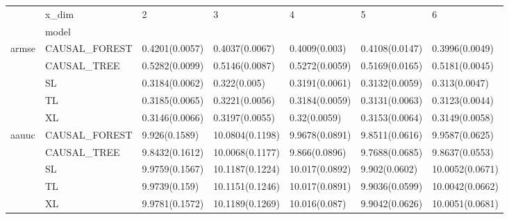 \begin{tabular}{lllllll}
\toprule
      & x\_dim &               2 &                3 &               4 &               5 &                6 \\
{} & model &                 &                  &                 &                 &                  \\
\midrule
armse & CAUSAL\_FOREST &  0.4201(0.0057) &   0.4037(0.0067) &   0.4009(0.003) &  0.4108(0.0147) &   0.3996(0.0049) \\
      & CAUSAL\_TREE &  0.5282(0.0099) &   0.5146(0.0087) &  0.5272(0.0059) &  0.5169(0.0165) &   0.5181(0.0045) \\
      & SL &  0.3184(0.0062) &     0.322(0.005) &  0.3191(0.0061) &  0.3132(0.0059) &    0.313(0.0047) \\
      & TL &  0.3185(0.0065) &   0.3221(0.0056) &  0.3184(0.0059) &  0.3131(0.0063) &   0.3123(0.0044) \\
      & XL &  0.3146(0.0066) &   0.3197(0.0055) &    0.32(0.0059) &  0.3153(0.0064) &   0.3149(0.0058) \\
aauuc & CAUSAL\_FOREST &   9.926(0.1589) &  10.0804(0.1198) &  9.9678(0.0891) &  9.8511(0.0616) &   9.9587(0.0625) \\
      & CAUSAL\_TREE &  9.8432(0.1612) &  10.0068(0.1177) &   9.866(0.0896) &  9.7688(0.0685) &   9.8637(0.0553) \\
      & SL &  9.9759(0.1567) &  10.1187(0.1224) &  10.017(0.0892) &   9.902(0.0602) &  10.0052(0.0671) \\
      & TL &   9.9739(0.159) &  10.1151(0.1246) &  10.017(0.0891) &  9.9036(0.0599) &  10.0042(0.0662) \\
      & XL &  9.9781(0.1572) &  10.1189(0.1269) &   10.016(0.087) &  9.9042(0.0626) &  10.0051(0.0681) \\
\bottomrule
\end{tabular}
